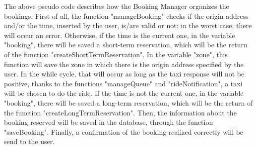 \vspace{0.5cm}

The above pseudo code describes how the Booking Manager organizes the bookings. 
First of all, the function "manageBooking" checks if the origin address and/or the time, inserted by the user, is/are valid or not: in the worst case, there will occur an error. 
Otherwise, if the time is the current one, in the variable "booking", there will be saved a short-term reservation, which will be the return of the function "createShortTermReservation". In the variable "zone", this function will save the zone in which there is the origin address specified by the user. 
In the while cycle, that will occur as long as the taxi response will not be positive, thanks to the functions "manageQueue" and "rideNotification", a taxi will be chosen to do the ride. 
If the time is not the current one, in the variable "booking", there will be saved a long-term reservation, which will be the return of the function "createLongTermReservation".
Then, the information about the booking reserved will be saved in the database, through the function "saveBooking".
Finally, a confirmation of the booking realized correctly will be send to the user.
